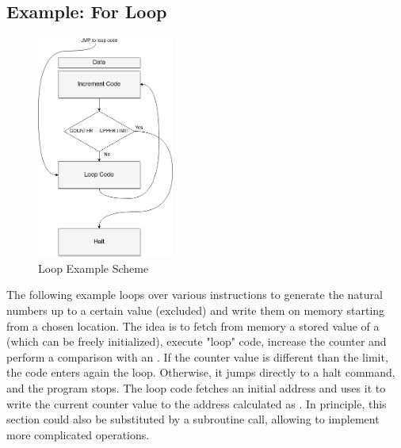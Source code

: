 \subsection{Example: For Loop}  \label{ssec:laser_technology}
\begin{figure}[hbtp]
    \centering
    \includegraphics[width=0.4\textwidth]{img/Loop.png}
    \caption{Loop Example Scheme}
    \label{fig:system}
\end{figure}

The following example loops over various instructions to generate the
natural numbers up to a certain value  (excluded) and write them on memory starting from a chosen location.
The idea is to fetch from memory a stored value of a  (which can be freely initialized), execute "loop" code, increase the counter and perform a comparison with an .
If the counter value is different than the limit, the code enters again the loop. Otherwise, it jumps directly to a halt command, and the program stops.
The loop code fetches an initial address  and uses it to write the current counter value to the address
calculated as .
In principle, this section could also be substituted by a subroutine call, allowing to implement more complicated operations.

